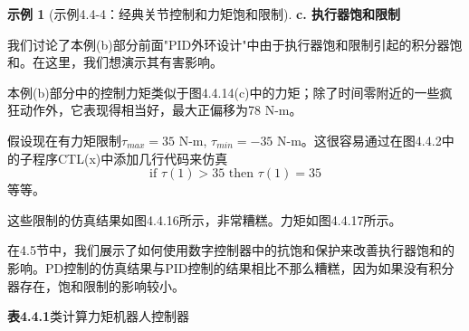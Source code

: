 \documentclass[UTF8]{ctexart}
\theoremstyle{definition}
\newtheorem{example}{示例}[section]
\begin{document}
\begin{example}[示例4.4-4：经典关节控制和力矩饱和限制]
\textbf{c. 执行器饱和限制}

我们讨论了本例(b)部分前面"PID外环设计"中由于执行器饱和限制引起的积分器饱和。在这里，我们想演示其有害影响。

本例(b)部分中的控制力矩类似于图4.4.14(c)中的力矩；除了时间零附近的一些疯狂动作外，它表现得相当好，最大正偏移为78 N-m。

假设现在有力矩限制$\tau_{max} = 35$ N-m, $\tau_{min} = -35$ N-m。这很容易通过在图4.4.2中的子程序CTL(x)中添加几行代码来仿真
\begin{equation*}
    \text{if } \tau(1) > 35 \text{ then } \tau(1) = 35
\end{equation*}
等等。

这些限制的仿真结果如图4.4.16所示，非常糟糕。力矩如图4.4.17所示。

在4.5节中，我们展示了如何使用数字控制器中的抗饱和保护来改善执行器饱和的影响。PD控制的仿真结果与PID控制的结果相比不那么糟糕，因为如果没有积分器存在，饱和限制的影响较小。
\end{example}

\textbf{表4.4.1}\quad 类计算力矩机器人控制器
\end{document}
